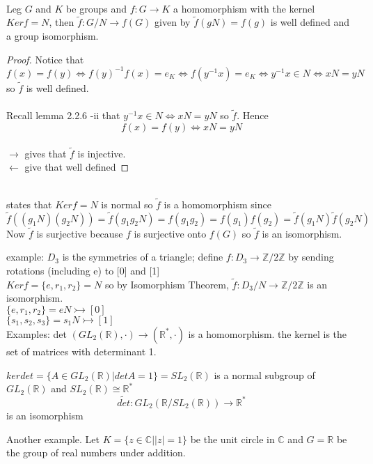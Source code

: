 \documentclass{article}
\begin{document}
\begin{theorem} \leavevmode\\ 
    Leg $G $ and $K$ be groups and $f: G \rightarrow K$ a homomorphism with the kernel $Ker f = N$, then $\tilde{f}: G /N \rightarrow f(G)$  given by $\tilde{f}(gN) = f(g)$ is well defined and a group isomorphism. 
\end{theorem}
\begin{proof}
    Notice that $f(x) = f(y) \iff f(y)^{-1} f(x) = e_K \iff f(y^{-1}x) = e_K \iff y^{-1}x \in N \iff xN = yN$ so $\tilde{f}$ is well defined. \\
   \\ Recall lemma 2.2.6 -ii that $y^{-1}x \in N \iff xN = yN$ so $\tilde{f}$. Hence $$f(x) = f(y) \iff xN = yN$$ \\ 
   $\rightarrow$ gives that $\tilde{f}$ is injective. \\
   $\leftarrow$ give that well defined
   \end{proof}

\begin{proposition}[2.4.9] \leavevmode \\ 
    states that $Ker f = N$ is normal so $\tilde{f}$ is a homomorphism since $\tilde{f}((g_1N)( g_2N)) = \tilde{f}(g_1 g_2 N) = f(g_1 g_2) = f(g_1) f(g_2) = \tilde{f}(g_1 N) \tilde{f}(g_2 N)$ \\ 
    Now $\tilde{f}$ is surjective because $f$ is surjective onto $f(G)$ so $\tilde{f}$ is an isomorphism. 
    
\end{proposition}
example: $D_3$ is the symmetries of a triangle; define $f: D_3 \rightarrow  \mathbb{Z} / 2 \mathbb{Z}$ by sending rotations (including e) to [0] and [1]
\\ 
$Ker f = \{e, r_1, r_2 \} = N $ so by Isomorphism Theorem, $\tilde{f}: D_3 / N \rightarrow \mathbb{Z} / 2\mathbb{Z}$ is an isomorphism. \\ 
$\{e, r_1, r_2\} = eN \rightarrowtail [0]$ \\
$\{s_1, s_2, s_3\} = s_1N \rightarrowtail [1]$ \\


Examples: det $(GL_2(\mathbb{R}), \cdot) \rightarrow (\mathbb{R}^*, \cdot)$ is a homomorphism. the kernel is the set of matrices with determinant 1. 

$ker det = \{A \in GL_2(\mathbb{R}) | det A = 1\} = SL_2(\mathbb{R})$ is a normal subgroup of $GL_2(\mathbb{R})$ and $SL_2(\mathbb{R}) \cong \mathbb{R}^*$
$$\tilde{det}: GL_2(\mathbb{R} / SL_2(\mathbb{R}) ) \rightarrow \mathbb{R}^*$$ is an isomorphism

Another example. Let 
$K = \{z \in \mathbb{C} | |z| = 1\}$ be the unit circle in $\mathbb{C}$ and $G = \mathbb{R}$ be the group of real numbers under addition.
 
\end{document}

